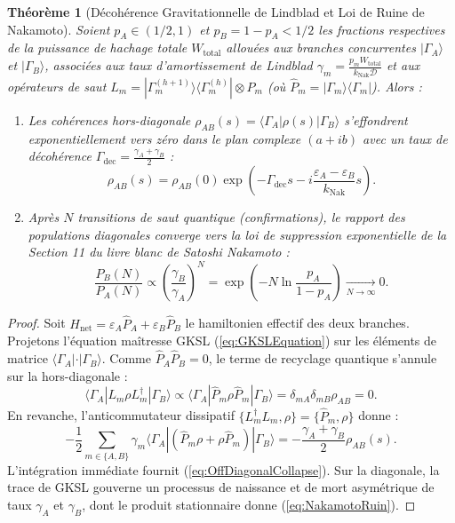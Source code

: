 \documentclass[10pt,twocolumn,a4paper]{article}
\theoremstyle{plain}
\newtheorem{theorem}{Théorème}[section]
\theoremstyle{definition}
\theoremstyle{remark}
\newcommand{\kNak}{k_{\text{Nak}}}
\begin{document}
\begin{theorem}[Décohérence Gravitationnelle de Lindblad et Loi de Ruine de Nakamoto]
Soient $p_A \in (1/2, 1)$ et $p_B = 1 - p_A < 1/2$ les fractions respectives de la puissance de hachage totale $W_{\text{total}}$ allouées aux branches concurrentes $|\Gamma_A\rangle$ et $|\Gamma_B\rangle$, associées aux taux d'amortissement de Lindblad $\gamma_m = \frac{p_m W_{\text{total}}}{\kNak \mathcal{D}}$ et aux opérateurs de saut $L_m = |\Gamma_m^{(h+1)}\rangle\langle\Gamma_m^{(h)}| \otimes \hat{P}_m$ (où $\hat{P}_m = |\Gamma_m\rangle\langle\Gamma_m|$). Alors :
\begin{enumerate}
    \item Les cohérences hors-diagonale $\rho_{AB}(s) = \langle\Gamma_A|\rho(s)|\Gamma_B\rangle$ s'effondrent exponentiellement vers zéro dans le plan complexe $(a + ib)$ avec un taux de décohérence $\Gamma_{\text{dec}} = \frac{\gamma_A + \gamma_B}{2}$ :
    \begin{equation}
        \rho_{AB}(s) = \rho_{AB}(0) \exp\left( -\Gamma_{\text{dec}} s - i \frac{\varepsilon_A - \varepsilon_B}{\kNak} s \right).
        \label{eq:OffDiagonalCollapse}
    \end{equation}
    \item Après $N$ transitions de saut quantique (confirmations), le rapport des populations diagonales converge vers la loi de suppression exponentielle de la Section 11 du livre blanc de Satoshi Nakamoto :
    \begin{equation}
        \frac{P_B(N)}{P_A(N)} \propto \left( \frac{\gamma_B}{\gamma_A} \right)^N = \exp\left( -N \ln\frac{p_A}{1 - p_A} \right) \underset{N \to \infty}{\longrightarrow} 0.
        \label{eq:NakamotoRuin}
    \end{equation}
\end{enumerate}
\end{theorem}

\begin{proof}
Soit $H_{\text{net}} = \varepsilon_A \hat{P}_A + \varepsilon_B \hat{P}_B$ le hamiltonien effectif des deux branches. Projetons l'équation maîtresse GKSL (\ref{eq:GKSLEquation}) sur les éléments de matrice $\langle\Gamma_A| \cdot |\Gamma_B\rangle$. Comme $\hat{P}_A \hat{P}_B = 0$, le terme de recyclage quantique s'annule sur la hors-diagonale :
\begin{equation}
    \langle\Gamma_A| L_m \rho L_m^\dagger |\Gamma_B\rangle \propto \langle\Gamma_A| \hat{P}_m \rho \hat{P}_m |\Gamma_B\rangle = \delta_{mA} \delta_{mB} \rho_{AB} = 0.
\end{equation}
En revanche, l'anticommutateur dissipatif $\{L_m^\dagger L_m, \rho\} = \{\hat{P}_m, \rho\}$ donne :
\begin{equation}
    -\frac{1}{2} \sum_{m \in \{A,B\}} \gamma_m \langle\Gamma_A| (\hat{P}_m \rho + \rho \hat{P}_m) |\Gamma_B\rangle = -\frac{\gamma_A + \gamma_B}{2} \rho_{AB}(s).
\end{equation}
L'intégration immédiate fournit (\ref{eq:OffDiagonalCollapse}). Sur la diagonale, la trace de GKSL gouverne un processus de naissance et de mort asymétrique de taux $\gamma_A$ et $\gamma_B$, dont le produit stationnaire donne (\ref{eq:NakamotoRuin}).
\end{proof}
\end{document}
